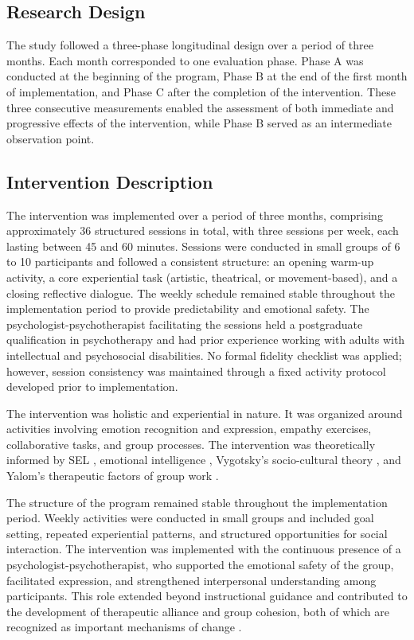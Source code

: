\documentclass[12pt,a4paper]{article}
\begin{document}
\subsection{Research Design}

The study followed a three-phase longitudinal design over a period of three months. Each month corresponded to one evaluation phase. Phase A was conducted at the beginning of the program, Phase B at the end of the first month of implementation, and Phase C after the completion of the intervention. These three consecutive measurements enabled the assessment of both immediate and progressive effects of the intervention, while Phase B served as an intermediate observation point.

\subsection{Intervention Description}

The intervention was implemented over a period of three months,
comprising approximately 36 structured sessions in total, with
three sessions per week, each lasting between 45 and 60 minutes.
Sessions were conducted in small groups of 6 to 10 participants
and followed a consistent structure: an opening warm-up activity,
a core experiential task (artistic, theatrical, or movement-based),
and a closing reflective dialogue. The weekly schedule remained
stable throughout the implementation period to provide predictability
and emotional safety. The psychologist-psychotherapist facilitating
the sessions held a postgraduate qualification in psychotherapy and
had prior experience working with adults with intellectual and
psychosocial disabilities. No formal fidelity checklist was applied;
however, session consistency was maintained through a fixed
activity protocol developed prior to implementation.

The intervention was holistic and experiential in nature. It was organized around activities involving emotion recognition and expression, empathy exercises, collaborative tasks, and group processes. The intervention was theoretically informed by SEL \citep{casel2020}, emotional intelligence \citep{goleman1995}, Vygotsky's socio-cultural theory \citep{vygotsky1978}, and Yalom's therapeutic factors of group work \citep{yalom2005}.

The structure of the program remained stable throughout the implementation period. Weekly activities were conducted in small groups and included goal setting, repeated experiential patterns, and structured opportunities for social interaction. The intervention was implemented with the continuous presence of a psychologist-psychotherapist, who supported the emotional safety of the group, facilitated expression, and strengthened interpersonal understanding among participants. This role extended beyond instructional guidance and contributed to the development of therapeutic alliance and group cohesion, both of which are recognized as important mechanisms of change \citep{norcross2018,burlingame2011}.
\end{document}
